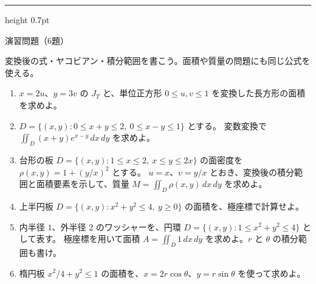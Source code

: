 \documentclass[a4paper,10pt,pdflatex,ja=standard,jafont=ipaex-type1,
  magstyle=real,scale=1]{bxjsarticle}
\newcommand{\topic}[1]{\par\vspace{5pt}%
  {\large\sffamily\mdseries\color{accent}#1}\par\vspace{2pt}}
\newenvironment{problems}
  {\begin{enumerate}[leftmargin=2em,itemsep=3pt,topsep=3pt,parsep=0pt,
    font=\color{accent}]}
  {\end{enumerate}}
\newcommand{\problemspace}{\par\vspace{5mm}}
\newcommand{\exercises}{%
  {\color{accent}\hrule height 0.7pt}\vspace{3pt}%
  \topic{演習問題（6題）}%
  {\small 変換後の式・ヤコビアン・積分範囲を書こう。面積や質量の問題にも同じ公式を使える。}\par}
\begin{document}
\noindent\begin{minipage}[b][0.5\textheight][t]{\linewidth}
\exercises
\begin{problems}
\item $x=2u$、$y=3v$ の $J_T$ と、単位正方形 $0\le u,v\le1$ を変換した長方形の面積を求めよ。
\problemspace

\item $D=\{(x,y):0\le x+y\le2,\ 0\le x-y\le1\}$ とする。
変数変換で $\iint_D(x+y)e^{x-y}\,dx\,dy$ を求めよ。
\problemspace

\item 台形の板 $D=\{(x,y):1\le x\le2,\ x\le y\le2x\}$ の面密度を $\rho(x,y)=1+(y/x)^2$ とする。
$u=x$、$v=y/x$ とおき、変換後の積分範囲と面積要素を示して、質量 $M=\iint_D\rho(x,y)\,dx\,dy$ を求めよ。
\problemspace

\item 上半円板 $D=\{(x,y):x^2+y^2\le4,\ y\ge0\}$ の面積を、極座標で計算せよ。
\problemspace

\item 内半径 $1$、外半径 $2$ のワッシャーを、円環 $D=\{(x,y):1\le x^2+y^2\le4\}$ として表す。
極座標を用いて面積 $A=\iint_D1\,dx\,dy$ を求めよ。$r$ と $\theta$ の積分範囲も書け。
\problemspace

\item 楕円板 $x^2/4+y^2\le1$ の面積を、$x=2r\cos\theta$、$y=r\sin\theta$ を使って求めよ。
\problemspace

\end{problems}
\end{minipage}
\end{document}
